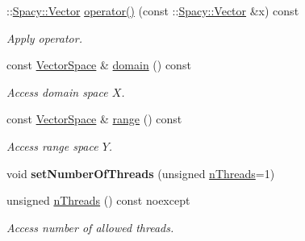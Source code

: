 \begin{DoxyCompactItemize}
\+::\hyperlink{classSpacy_1_1Vector}{Spacy\+::\+Vector} \hyperlink{classSpacy_1_1Kaskade_1_1Operator_a598da59e26cce77e41619ba554db5eb4}{operator()} (const \+::\hyperlink{classSpacy_1_1Vector}{Spacy\+::\+Vector} \&x) const 
\begin{DoxyCompactList}\small\item\em Apply operator. \end{DoxyCompactList}\item 
\hypertarget{classSpacy_1_1OperatorBase_a2588f9b3e0188820c4c494e63293dc6f}{}const \hyperlink{classSpacy_1_1VectorSpace}{Vector\+Space} \& \hyperlink{classSpacy_1_1OperatorBase_a2588f9b3e0188820c4c494e63293dc6f}{domain} () const \label{classSpacy_1_1OperatorBase_a2588f9b3e0188820c4c494e63293dc6f}

\begin{DoxyCompactList}\small\item\em Access domain space $X$. \end{DoxyCompactList}\item 
\hypertarget{classSpacy_1_1OperatorBase_ab19d3b7a6f290b1079248f1e567e53d6}{}const \hyperlink{classSpacy_1_1VectorSpace}{Vector\+Space} \& \hyperlink{classSpacy_1_1OperatorBase_ab19d3b7a6f290b1079248f1e567e53d6}{range} () const \label{classSpacy_1_1OperatorBase_ab19d3b7a6f290b1079248f1e567e53d6}

\begin{DoxyCompactList}\small\item\em Access range space $Y$. \end{DoxyCompactList}\item 
\hypertarget{classSpacy_1_1Mixin_1_1NumberOfThreads_ab0c2fca77cb0d613e3bb8ce5bda11fdc}{}void {\bfseries set\+Number\+Of\+Threads} (unsigned \hyperlink{classSpacy_1_1Mixin_1_1NumberOfThreads_a385963b95b5e1ddf422393146cc71ee1}{n\+Threads}=1)\label{classSpacy_1_1Mixin_1_1NumberOfThreads_ab0c2fca77cb0d613e3bb8ce5bda11fdc}

\item 
\hypertarget{classSpacy_1_1Mixin_1_1NumberOfThreads_a385963b95b5e1ddf422393146cc71ee1}{}unsigned \hyperlink{classSpacy_1_1Mixin_1_1NumberOfThreads_a385963b95b5e1ddf422393146cc71ee1}{n\+Threads} () const noexcept\label{classSpacy_1_1Mixin_1_1NumberOfThreads_a385963b95b5e1ddf422393146cc71ee1}

\begin{DoxyCompactList}\small\item\em Access number of allowed threads. \end{DoxyCompactList}\end{DoxyCompactItemize}


